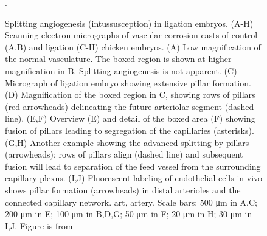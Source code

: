 \begin{itemize}
\begin{figure}
		\caption{Splitting angiogenesis (intussusception) in ligation embryos. (A-H) Scanning electron micrographs of vascular corrosion casts of control (A,B) and ligation (C-H) chicken embryos. (A) Low magnification of the normal vasculature. The boxed region is shown at higher magnification in B. Splitting angiogenesis is not apparent. (C) Micrograph of ligation embryo showing extensive pillar formation. (D) Magnification of the boxed region in C, showing rows of pillars (red arrowheads) delineating the future arteriolar segment (dashed line). (E,F) Overview (E) and detail of the boxed area (F) showing fusion of pillars leading to segregation of the capillaries (asterisks). (G,H) Another example showing the advanced splitting by pillars (arrowheads); rows of pillars align (dashed line) and subsequent fusion will lead to separation of the feed vessel from the surrounding capillary plexus. (I,J) Fluorescent labeling of endothelial cells in vivo shows pillar formation (arrowheads) in distal arterioles and the connected capillary network. art, artery. Scale bars: 500 μm in A,C; 200 μm in E; 100 μm in B,D,G; 50 μm in F; 20 μm in H; 30 μm in I,J. Figure is from \cite{Buschmann2010}}.
	\end{figure}
	
\end{itemize}



